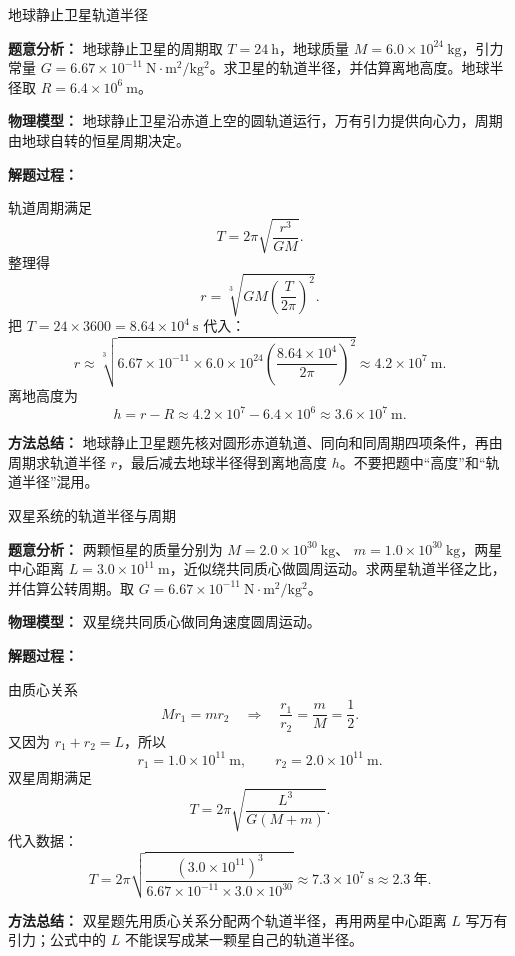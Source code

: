 \begin{examplebox}{地球静止卫星轨道半径}

\textbf{题意分析：} 地球静止卫星的周期取 $T=24\ \mathrm{h}$，地球质量 $M=6.0\times10^{24}\ \mathrm{kg}$，引力常量 $G=6.67\times10^{-11}\ \mathrm{N\cdot m^2/kg^2}$。求卫星的轨道半径，并估算离地高度。地球半径取 $R=6.4\times10^6\ \mathrm{m}$。

\textbf{物理模型：} 地球静止卫星沿赤道上空的圆轨道运行，万有引力提供向心力，周期由地球自转的恒星周期决定。

\begin{center}

\end{center}

\textbf{解题过程：}

轨道周期满足
\[
T=2\pi\sqrt{\frac{r^3}{GM}}.
\]
整理得
\[
r=\sqrt[3]{GM\left(\frac{T}{2\pi}\right)^2}.
\]
把 $T=24\times3600=8.64\times10^4\ \mathrm{s}$ 代入：
\[
r\approx\sqrt[3]{6.67\times10^{-11}\times6.0\times10^{24}
\left(\frac{8.64\times10^4}{2\pi}\right)^2}
\approx4.2\times10^7\ \mathrm{m}.
\]
离地高度为
\[
h=r-R\approx4.2\times10^7-6.4\times10^6
\approx3.6\times10^7\ \mathrm{m}.
\]

\textbf{方法总结：} 地球静止卫星题先核对圆形赤道轨道、同向和同周期四项条件，再由周期求轨道半径 $r$，最后减去地球半径得到离地高度 $h$。不要把题中“高度”和“轨道半径”混用。
\end{examplebox}

\begin{examplebox}{双星系统的轨道半径与周期}

\textbf{题意分析：} 两颗恒星的质量分别为 $M=2.0\times10^{30}\ \mathrm{kg}$、
$m=1.0\times10^{30}\ \mathrm{kg}$，两星中心距离
$L=3.0\times10^{11}\ \mathrm{m}$，近似绕共同质心做圆周运动。求两星轨道半径之比，并估算公转周期。取
$G=6.67\times10^{-11}\ \mathrm{N\cdot m^2/kg^2}$。

\textbf{物理模型：} 双星绕共同质心做同角速度圆周运动。

\textbf{解题过程：}

由质心关系
\[
Mr_1=mr_2
\quad\Longrightarrow\quad
\frac{r_1}{r_2}=\frac{m}{M}=\frac12.
\]
又因为 $r_1+r_2=L$，所以
\[
r_1=1.0\times10^{11}\ \mathrm{m},
\qquad
r_2=2.0\times10^{11}\ \mathrm{m}.
\]
双星周期满足
\[
T=2\pi\sqrt{\frac{L^3}{G(M+m)}}.
\]
代入数据：
\[
T=2\pi\sqrt{\frac{(3.0\times10^{11})^3}
{6.67\times10^{-11}\times3.0\times10^{30}}}
\approx7.3\times10^7\ \mathrm{s}
\approx2.3\ \text{年}.
\]

\textbf{方法总结：} 双星题先用质心关系分配两个轨道半径，再用两星中心距离 $L$ 写万有引力；公式中的 $L$ 不能误写成某一颗星自己的轨道半径。

\end{examplebox}

